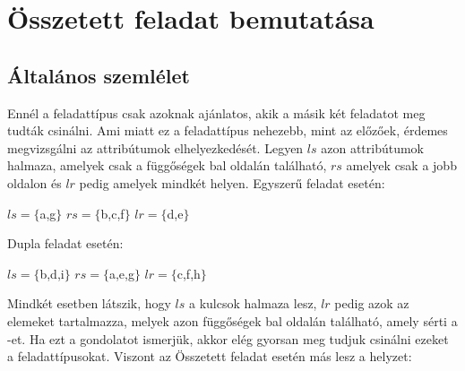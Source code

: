\section{Összetett feladat bemutatása}

\subsection{Általános szemlélet}

Ennél a feladattípus csak azoknak ajánlatos, akik a másik két feladatot meg tudták csinálni. Ami miatt ez a feladattípus nehezebb, mint az előzőek, érdemes megvizsgálni az attribútumok elhelyezkedését. Legyen $ls$ azon attribútumok halmaza, amelyek csak a függőségek bal oldalán található, $rs$ amelyek csak a jobb oldalon és $lr$ pedig amelyek mindkét helyen.
Egyszerű feladat esetén:
\begin{center}
    $ls = \{$a,g$\}$ \break
    $rs = \{$b,c,f$\}$ \break
    $lr = \{$d,e$\}$
\end{center}
Dupla feladat esetén: 
\begin{center}
    $ls = \{$b,d,i$\}$ \break
    $rs = \{$a,e,g$\}$ \break
    $lr = \{$c,f,h$\}$
\end{center}

Mindkét esetben látszik, hogy $ls$ a kulcsok halmaza lesz, $lr$ pedig azok az elemeket tartalmazza, melyek azon függőségek bal oldalán található, amely sérti a \nfh-et. Ha ezt a gondolatot ismerjük, akkor elég gyorsan meg tudjuk csinálni ezeket a feladattípusokat.
Viszont az Összetett feladat esetén más lesz a helyzet:

